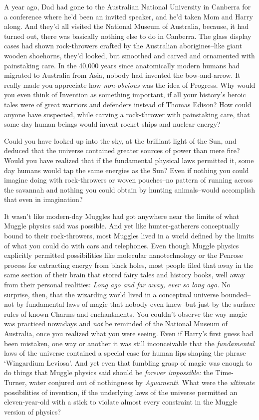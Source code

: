 A year ago, Dad had gone to the Australian National University in Canberra for a conference where he'd been an invited speaker, and he'd taken Mom and Harry along. And they'd all visited the National Museum of Australia, because, it had turned out, there was basically nothing else to do in Canberra. The glass display cases had shown rock-throwers crafted by the Australian aborigines\---like giant wooden shoehorns, they'd looked, but smoothed and carved and ornamented with painstaking care. In the 40,000 years since anatomically modern humans had migrated to Australia from Asia, nobody had invented the bow-and-arrow. It really made you appreciate how \emph{non-obvious} was the idea of Progress. Why would you even think of Invention as something important, if all your history's heroic tales were of great warriors and defenders instead of Thomas Edison? How could anyone have suspected, while carving a rock-thrower with painstaking care, that some day human beings would invent rocket ships and nuclear energy?

Could you have looked up into the sky, at the brilliant light of the Sun, and deduced that the universe contained greater sources of power than mere fire? Would you have realized that if the fundamental physical laws permitted it, some day humans would tap the same energies as the Sun? Even if nothing you could imagine doing with rock-throwers or woven pouches\---no pattern of running across the savannah and nothing you could obtain by hunting animals\---would accomplish that even in imagination?

It wasn't like modern-day Muggles had got anywhere near the limits of what Muggle physics said was possible. And yet like hunter-gatherers conceptually bound to their rock-throwers, most Muggles lived in a world defined by the limits of what you could do with cars and telephones. Even though Muggle physics explicitly permitted possibilities like molecular nanotechnology or the Penrose process for extracting energy from black holes, most people filed that away in the same section of their brain that stored fairy tales and history books, well away from their personal realities: \emph{Long ago and far away, ever so long ago.} No surprise, then, that the wizarding world lived in a conceptual universe bounded\---not by fundamental laws of magic that nobody even knew\---but just by the surface rules of known Charms and enchantments. You couldn't observe the way magic was practiced nowadays and \emph{not} be reminded of the National Museum of Australia, once you realized what you were seeing. Even if Harry's first guess had been mistaken, one way or another it was still inconceivable that the \emph{fundamental} laws of the universe contained a special case for human lips shaping the phrase `Wingardium Leviosa'. And yet even that fumbling grasp of magic was enough to do things that Muggle physics said should be \emph{forever impossible:} the Time-Turner, water conjured out of nothingness by \emph{Aguamenti}. What were the \emph{ultimate} possibilities of invention, if the underlying laws of the universe permitted an eleven-year-old with a stick to violate almost every constraint in the Muggle version of physics?

